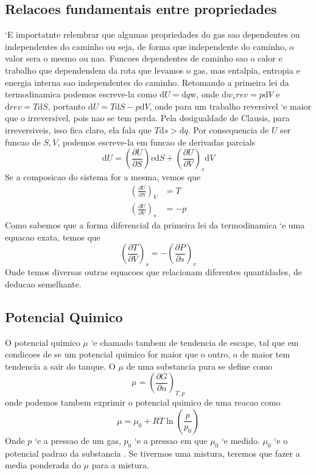 \subsection{Relacoes fundamentais entre propriedades}
`E importatnte relembrar que algumas propriedades do gas sao dependentes ou independentes do caminho
ou seja, de forma que independente do caminho, o valor sera o mesmo ou nao. Funcoes dependentes de
caminho sao o calor e trabalho que dependendem da rota que levamos o gas, mas entalpia, entropia e energia 
interna sao independentes do caminho. Retomando a primeira lei da termodinamica podemos escreve-la como \(\mathrm{d}U=\mathrm{d}q \mathrm{w}\),
onde \(\mathrm{d}w_r{rev}=p\mathrm{d}V\) e \(\mathrm{d}{rev}=T\mathrm{d}S\), portanto
\(\mathrm{d}U=T\mathrm{d}S-p\mathrm{d}V\), onde para um trabalho reversivel `e maior que o irreversivel, pois nao se tem perda.
Pela desigualdade de Clausis, para irreversiveis, isso fica claro, ela fala que \(T\mathrm{d}s > \mathrm{d}q\).
Por consequencia de \(U\) ser funcao de \(S,V\), podemos escreve-la em funcao de derivadas parcials
\begin{equation}
    \mathrm{d}U=(\frac{\partial U}{\partial S})v\mathrm{d}S+(\frac{\partial U}{\partial V})_s \mathrm{d}V
\end{equation}
Se a composicao do sistema  for a mesma, vemos que
\begin{align}
    (\frac{\partial U}{\partial S})_V&=T\\
    (\frac{\partial U}{\partial V})_s&=-p
\end{align}
Como sabemos que a forma diferencial da primeira lei da termodinamica `e uma equacao exata, temos que
\begin{equation}
    (\frac{\partial T}{\partial V})_s=-(\frac{\partial P}{\partial s})_v
\end{equation}
Onde temos diversas outras equacoes que relacionam diferentes quantidades, de deducao semelhante.
\subsection{Potencial Quimico}
O potencial quimico \(\mu\) `e chamado tambem de tendencia de escape, tal que em condicoes de se um potencial
quimico for maior que o outro, o de maior tem tendencia a sair do tanque. O \(\mu\) de uma substancia pura se define como
\begin{equation}
    \mu =(\frac{\partial G}{\partial n})_{T,p}
\end{equation}
onde podemos tambem exprimir o potencial quimico de uma reacao como
\begin{equation}
    \mu =\mu _0 +RT \ln (\frac{p}{p_0})
\end{equation}
Onde \(p\) `e a pressao de um gas, \(p_0\) `e a pressao em que \(\mu _0\) `e medido. \(\mu _0\) `e o potencial padrao da substancia . Se tivermos uma mistura, teremos que fazer a media ponderada do \(\mu\) para a mistura.
